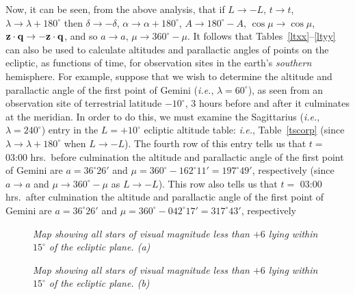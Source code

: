Now, it can be seen, from the above analysis, that if $L\rightarrow -L$, $t\rightarrow t$, $\lambda\rightarrow \lambda+180^\circ$ then $\delta\rightarrow -\delta$, $\alpha \rightarrow \alpha+180^\circ$,  $A\rightarrow180^\circ-A$,  $\cos\mu\rightarrow \cos\mu$, ${\bf z}\cdot{\bf q} \rightarrow -{\bf z}\cdot{\bf q}$, and so $a\rightarrow a$, $\mu\rightarrow 360^\circ-\mu$. 
It follows that Tables~\ref{ltxx}--\ref{ltyy} can also be used to calculate altitudes and parallactic angles of  points on the
ecliptic, as functions of
time, for  observation sites in the earth's {\em southern}\/ hemisphere. For example, suppose that we wish to
determine the altitude and parallactic angle of the first point of Gemini ({\em i.e.}, $\lambda=60^\circ$), as seen from an observation site of terrestrial latitude $-10^\circ$,  3 hours before and after it
culminates at the meridian. 
In order to do this, we must examine the Sagittarius  ({\em i.e.}, $\lambda=240^\circ$) entry in the $L=+10^\circ$ ecliptic altitude table: {\em i.e.}, Table~\ref{tscorp} (since $\lambda\rightarrow \lambda+180^\circ$
when $L\rightarrow -L$). The fourth row of this entry tells us that $t=$\,\,03:00 hrs.\ before culmination the altitude and
parallactic angle of the first point of Gemini are $a=36^\circ 26'$ and
$\mu=360^\circ -162^\circ 11'=197^\circ 49'$, respectively (since $a\rightarrow a$ and $\mu\rightarrow 360^\circ-\mu$ as
$L\rightarrow-L$).
This row also tells us that $t=$\,\,03:00 hrs.\ after culmination the altitude and
parallactic angle of the first point of Gemini are $a=36^\circ 26'$ and
$\mu=360^\circ -042^\circ 17'=317^\circ 43'$, respectively

\newpage
\begin{figure}[h]
\epsfysize=5.5in
\centerline{}
\caption[{\em Map of stars close to the ecliptic plane. (a)}]{\em Map showing all stars of visual magnitude less than $+6$ lying within $15^\circ$ of the ecliptic plane. (a)}\label{map1}
\end{figure}
\newpage
\begin{figure}[h]
\epsfysize=5.5in
\centerline{}
\caption[{\em Map of stars close to the ecliptic plane. (b)}]{\em Map showing all stars of visual magnitude less than $+6$ lying within $15^\circ$ of the ecliptic plane. (b)}\label{map2}
\end{figure}

